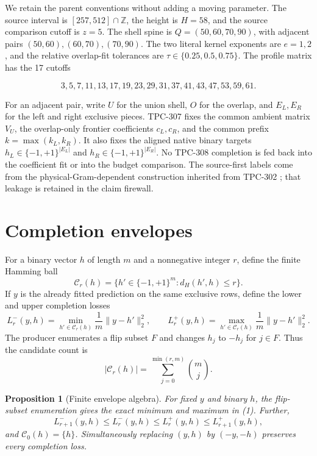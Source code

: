 \documentclass[11pt]{article}
\newtheorem{proposition}{Proposition}
\begin{document}
We retain the parent conventions without adding a moving parameter.  The
source interval is $[257,512]\cap\mathbb Z$, the height is $H=58$, and the
source comparison cutoff is $z=5$.  The shell spine is
$Q=(50,60,70,90)$, with adjacent pairs
$(50,60),(60,70),(70,90)$.  The two literal kernel exponents are $e=1,2$,
and the relative overlap-fit tolerances are
$\tau\in\{0.25,0.5,0.75\}$.  The profile matrix has the 17 cutoffs

\[
  3,5,7,11,13,17,19,23,29,31,37,41,43,47,53,59,61.
\]

For an adjacent pair, write $U$ for the union shell, $O$ for the overlap,
and $E_L,E_R$ for the left and right exclusive pieces.  TPC-307 fixes the
common ambient matrix $V_U$, the overlap-only frontier coefficients
$c_L,c_R$, and the common prefix
$k=\max(k_L,k_R)$.  It also fixes the aligned native binary targets
$h_L\in\{-1,+1\}^{|E_L|}$ and
$h_R\in\{-1,+1\}^{|E_R|}$.  No TPC-308 completion is fed back into the
coefficient fit or into the budget comparison.  The source-first labels
come from the physical-Gram-dependent construction inherited from TPC-302
\cite{tpc302}; that leakage is retained in the claim firewall.

\section{Completion envelopes}

For a binary vector $h$ of length $m$ and a nonnegative integer $r$, define
the finite Hamming ball
\[
  \mathcal C_r(h)=\{h'\in\{-1,+1\}^m:d_H(h',h)\le r\}.
\]
If $y$ is the already fitted prediction on the same exclusive rows, define
the lower and upper completion losses
\[
  L_r^-(y,h)=\min_{h'\in\mathcal C_r(h)}
       \frac{1}{m}\|y-h'\|_2^2,
  \qquad
  L_r^+(y,h)=\max_{h'\in\mathcal C_r(h)}
       \frac{1}{m}\|y-h'\|_2^2.                         \tag{1}
\]
The producer enumerates a flip subset $F$ and changes $h_j$ to $-h_j$ for
$j\in F$.  Thus the candidate count is
\[
  |\mathcal C_r(h)|=
  \sum_{j=0}^{\min(r,m)} \binom{m}{j}.                  \tag{2}
\]

\begin{proposition}[Finite envelope algebra]
For fixed $y$ and binary $h$, the flip-subset enumeration gives the exact
minimum and maximum in (1).  Further,
\[
 L_{r+1}^-(y,h)\le L_r^-(y,h)\le L_r^+(y,h)
 \le L_{r+1}^+(y,h),                                    \tag{3}
\]
and $\mathcal C_0(h)=\{h\}$.  Simultaneously replacing $(y,h)$ by
$(-y,-h)$ preserves every completion loss.
\end{proposition}
\end{document}
